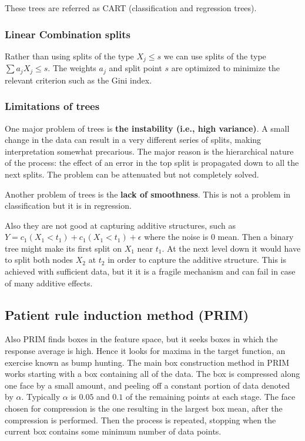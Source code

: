 \documentclass[12pt, letterpaper]{article}
\theoremstyle{definition}
\begin{document}
These trees are referred as CART (classification and regression trees).
\subsubsection{Linear Combination splits}
Rather than using splits of the type $X_j\le s$ we can use splits of the type $\sum a_j X_j \le s$. The weights $a_j$ and split point $s$ are optimized to minimize the relevant criterion  such as the Gini index.

\subsubsection{Limitations of trees}
One major problem of trees is \textbf{the instability (i.e., high variance)}. A small change in the data can result in a very different series of splits, making interpretation somewhat precarious. The major reason is the hierarchical nature of the process: the effect of an error in the top split is propagated down to all the next splits. The problem can be attenuated but not completely solved.

Another problem of trees is the \textbf{lack of smoothness}. This is not a problem in classification but it is in regression.

Also they are not good at capturing additive structures, such as $Y = c_1 (X_1 < t_1) + c_1 (X_1 < t_1)+\epsilon$ where the noise is $0$ mean. Then a binary tree might make its first split on $X_1$ near $t_1$. At the next level down it would have to split both nodes $X_2$ at $t_2$ in order to capture the additive structure. This is achieved with sufficient data, but it it is a fragile mechanism and can fail in case of many additive effects.
\subsection{Patient rule induction method (PRIM)}
Also PRIM finds boxes in the feature space, but it seeks boxes in which the response average is high. Hence it looks for maxima in the target function, an exercise known as bump hunting. The main box construction method in PRIM works starting with a box containing all of the data. The box is compressed along one face by a small amount, and peeling off a constant portion of data denoted by $\alpha$. Typically $\alpha$ is $0.05$ and $0.1$ of the remaining points at each stage. The face chosen for compression is the one resulting in the largest box mean, after the compression is performed. Then the process is repeated, stopping when the current box contains some minimum number of data points.
\end{document}
